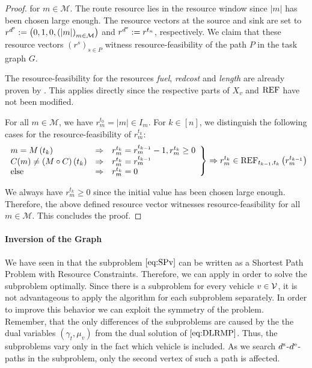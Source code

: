 \begin{proof}
for $m\in\mathcal{M}$. The route resource lies in the resource window since $\vert m\vert$ has been chosen large enough. The resource vectors at the source and sink are set to\linebreak
${r^{d^{\operatorname{s}}} := \left(0,1,0,\left(\vert m\vert\right)_{m\in\mathcal{M}}\right)}$ and ${r^{d^{\operatorname{e}}} := r^{t_n}}$, respectively. We claim that these resource vectors $\left(r^s\right)_{s\in P}$ witness resource-feasibility of the path $P$ in the task graph $G$. 

The resource-feasibility for the resources \emph{fuel}, \emph{redcost} and \emph{length} are already proven by \cite{Kaiser}. This applies directly since the respective parts of $X_v$ and $\operatorname{REF}$ have not been modified.

For all $m\in\mathcal{M}$, we have ${r^{t_0}_m = \vert m\vert\in I_m}$. For ${k\in[n]}$, we distinguish the following cases for the resource-feasibility of $r^{t_k}_m$:
\begin{align*}
	\left. \begin{array}{lll}
		m = M\left(t_k\right) & \Rightarrow & r^{t_k}_m = r^{t_{k-1}}_m - 1, r^{t_k}_m\geq 0 \\
		C(m)\neq\left(M\circ C\right)\left(t_k\right) & \Rightarrow  & r^{t_k}_m = r^{t_{k-1}}_m \\
		\text{else} & \Rightarrow & r^{t_k}_m = 0
	\end{array} \right\} \Rightarrow r^{t_k}_m\in\operatorname{REF}_{t_{k-1},t_k}\left(r^{t_{k-1}}_m\right)
\end{align*}

We always have ${r^{t_k}_m\geq 0}$ since the initial value has been chosen large enough. Therefore, the above defined resource vector witnesses resource-feasibility for all $m\in\mathcal{M}$. This concludes the proof.
%
\end{proof}

\paragraph{Inversion of the Graph} \parfill

We have seen in  that the subproblem $\eqref{eq:SPv}$ can be written as a Shortest Path Problem with Resource Constraints. Therefore, we can apply  in order to solve the subproblem optimally. Since there is a subproblem for every vehicle $v\in\mathcal{V}$, it is not advantageous to apply the algorithm for each subproblem separately. In order to improve this behavior we can exploit the symmetry of the problem. Remember, that the only differences of the subproblems are caused by the the dual variables $\left(\gamma_t,\mu_v\right)$ from the dual solution of $\eqref{eq:DLRMP}$. Thus, the subproblems vary only in the fact which vehicle is included. As we search $d^{\operatorname{s}}$-$d^{\operatorname{e}}$-paths in the subproblem, only the second vertex of such a path is affected. 

